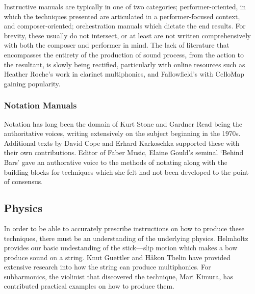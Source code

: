 Instructive manuals are typically in one of two categories; performer-oriented, in which the techniques presented are articulated in a performer-focused context, and composer-oriented; orchestration manuals which dictate the end results.
For brevity, these usually do not intersect, or at least are not written comprehensively with both the composer and performer in mind. 
The lack of literature that encompasses the entirety of the production of sound process, from the action to the resultant, is slowly being rectified, particularly with online resources such as Heather Roche's work in clarinet multiphonics, and Fallowfield's with CelloMap gaining popularity.\autocite{rocheHeatherRoche, fallowfieldCelloMap}
\subsubsection{Notation Manuals}
Notation has long been the domain of Kurt Stone and Gardner Read being the authoritative voices, writing extensively on the subject beginning in the 1970s.\autocite{stoneMusicNotationTwentieth1980,readCompendiumModernInstrumental1993,readContemporaryInstrumentalTechniques1976,readMusicNotationManual1979a}
Additional texts by David Cope and Erhard Karkoschka supported these with their own contributions.\autocite{copeNewMusicNotation1976,karkoschkaNotationNewMusic1972}
Editor of Faber Music, Elaine Gould's seminal `Behind Bars' gave an authorative voice to the methods of notating along with the building blocks for techniques which she felt had not been developed to the point of consensus.\autocite[iii]{gouldBars2011}

\subsection{Physics}
In order to be able to accurately prescribe instructions on how to produce these techniques, there must be an understanding of the underlying physics.
Helmholtz provides our basic undestanding of the stick---slip motion which makes a bow produce sound on a string.\autocite{helmholtzSensationsTonePhysiological1954}
Knut Guettler and Håkon Thelin have provided extensive research into how the string can produce multiphonics.\autocite{thelinAnalysisBowedStringMultiphonics,thelinMultiphonicsDoubleBass2011,guettlerBowedstringMultiphonicsAnalyzed2012,guettlerGuideAdvancedModern1992,guettlerWaveAnalysisString1994}
\autocite{schumacherTransientBehaviourModels1995,askenfeltMeasurementBowingParameters1989,marshallModalAnalysisViolin1985}
For subharmonics, the violinist that discovered the technique, Mari Kimura, has contributed practical examples on how to produce them.\autocite{kimuraHowProduceSubharmonics1999}
\autocite{moresFurtherEmpiricalData2019,guettlerBowedStringDevelopment2002,schoonderwaldtViolinistSoundPalette2009,hutchinsSubharmonicsPlateTap1960,cantrellSubharmonicGenerationChaos2015}

